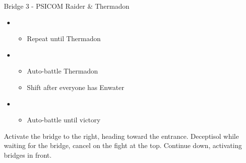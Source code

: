 \begin{multicols}{2}
\begin{battle}{Bridge 3 - PSICOM Raider \& Thermadon}
\begin{itemize}
\begin{itemize}
        \item Repeat Thermadon
    \end{itemize}
    \item \fourth
    \begin{itemize}
        \item Repeat until Thermadon \stagger
    \end{itemize}
    \item \first
    \begin{itemize}
        \item Auto-battle Thermadon
        \item Shift after everyone has Enwater
    \end{itemize}
    \item \fifth
    \begin{itemize}
        \item Auto-battle until victory
    \end{itemize}
\end{itemize}
  
\end{battle}

Activate the bridge to the right, heading toward the entrance. Deceptisol while waiting for the bridge, cancel on the fight at the top. Continue down, activating bridges in front.
\vfill
\end{multicols}
